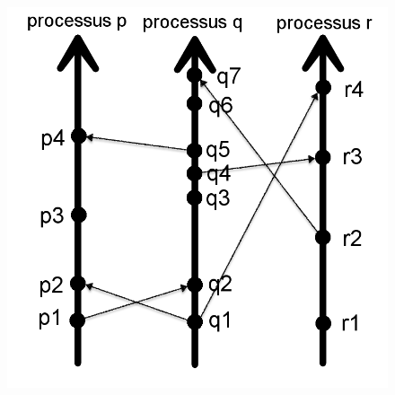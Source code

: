 \documentclass[compress]{beamer}
\begin{document}
\begin{frame}
\begin{figure}
\includegraphics[scale=0.3]{process2.png}
\end{figure}
\end{frame}
\end{document}
